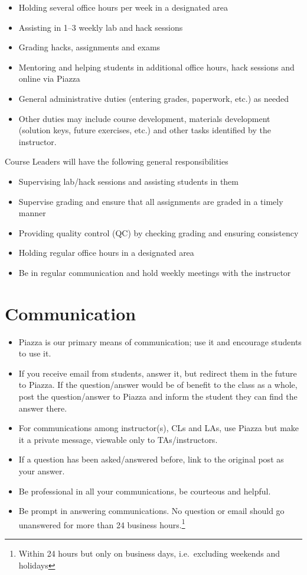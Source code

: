 \documentclass[12pt]{scrartcl}
\begin{document}
\begin{itemize}
  \item Holding several office hours per week in a designated area
  \item Assisting in 1--3 weekly lab and hack sessions
  \item Grading hacks, assignments and exams
  \item Mentoring and helping students in additional office hours, hack sessions
  and online via Piazza
  \item General administrative duties (entering grades, paperwork, etc.) as needed
  \item Other duties may include course development, materials development 
  (solution keys, future exercises, etc.) and other tasks identified by the instructor.
\end{itemize}

Course Leaders will have the following general responsibilities
\begin{itemize}
  \item Supervising lab/hack sessions and assisting students in them
  \item Supervise grading and ensure that all assignments are graded 
    in a timely manner
  \item Providing quality control (QC) by checking grading and ensuring consistency
  \item Holding regular office hours in a designated area
  \item Be in regular communication and hold weekly meetings with the instructor
\end{itemize}


\section*{Communication}

\begin{itemize}
  \item Piazza is our primary means of communication; use it and encourage 
students to use it.  
  \item If you receive email from students, answer it, 
but redirect them in the future to Piazza.  If the question/answer
would be of benefit to the class as a whole, post the question/answer
to Piazza and inform the student they can find the answer there.
  \item For communications among instructor(s), CLs and LAs, use Piazza but
make it a private message, viewable only to TAs/instructors.
  \item If a question has been asked/answered before, link to the original
  post as your answer.  
  \item Be professional in all your communications, be courteous and
  helpful.  
  \item Be prompt in answering communications.  No question or email should go 
  unanswered for more than 24 business hours.\footnote{Within 24 hours but only
  on business days, i.e.\ excluding weekends and holidays}
\end{itemize}
\end{document}
